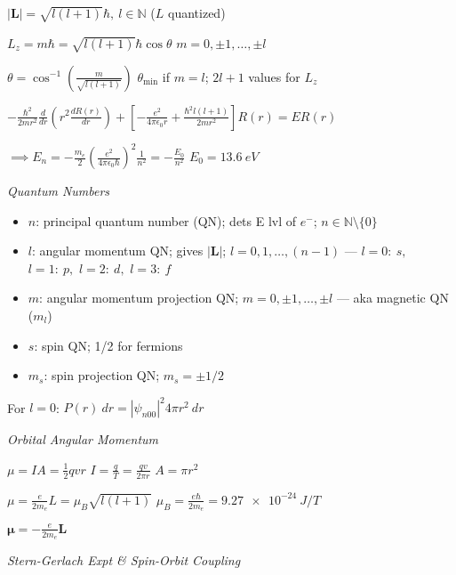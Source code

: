 \documentclass[twocolumn]{article}
\begin{document}
$|\mathbf{L}| = \sqrt{l(l+1)} \hbar,\ l \in \mathbb{N}$ \hfill ($L$ quantized)

$L_z = m\hbar = \sqrt{l(l+1)} \hbar \cos \theta$ \hfill $m = 0, \pm 1, \dots, \pm l$

$\theta = \cos^{-1} \left( \frac{m}{\sqrt{l(l+1)}} \right)$ \hfill $\theta_{\min}$ if $m = l$; $2l+1$ values for $L_z$

\cleardoublepage

$-\frac{\hbar^2}{2mr^2} \frac{d}{dr} \left(r^2 \frac{dR(r)}{dr}\right) + \left[ -\frac{e^2}{4 \pi \epsilon_0 r} + \frac{\hbar^2 l(l+1)}{2mr^2} \right] R(r) = ER(r)$

$\implies E_n = -\frac{m_e}{2} \left( \frac{e^2}{4\pi\epsilon_0\hbar} \right)^2 \frac{1}{n^2} = -\frac{E_0}{n^2}$ \hfill $E_0 = \SI{13.6}{eV}$

\dotfill

\textit{Quantum Numbers}

\vspace{-.5em}
\begin{itemize}
    \item $n$: principal quantum number (QN); dets E lvl of $e^-$; $n \in \mathbb{N} \setminus \{0\}$
    \item $l$: angular momentum QN; gives $|\mathbf{L}|$; $l = 0, 1, \dots, (n-1)$
    \subitem--- $l=0:\ s,$ \hfill $l=1:\ p,$ \hfill $l=2:\ d,$ \hfill $l=3:\ f$
    \item $m$: angular momentum projection QN; $m = 0, \pm 1, \dots, \pm l$
    \subitem--- aka magnetic QN ($m_l$)
    \item $s$: spin QN; 1/2 for fermions
    \item $m_s$: spin projection QN; $m_s = \pm 1/2$
\end{itemize} \vspace{-.5em}

For $l=0$: $P(r)\ dr = |\psi_{n00}|^2 4\pi r^2\ dr$

\vspace{-.5em}
\dotfill

\textit{Orbital Angular Momentum}

$\mu = IA = \frac{1}{2} qvr$ \hfill $I = \frac{q}{T} = \frac{qv}{2\pi r}$ \hfill $A = \pi r^2$

$\mu = \frac{e}{2m_e} L = \mu_B \sqrt{l(l+1)}$ \hfill $\mu_B = \frac{e\hbar}{2m_e} = \SI{9.27e-24}{J/T}$

$\boldsymbol \mu = -\frac{e}{2m_e} \mathbf{L}$

\dotfill

\textit{Stern-Gerlach Expt \& Spin-Orbit Coupling}
\end{document}
